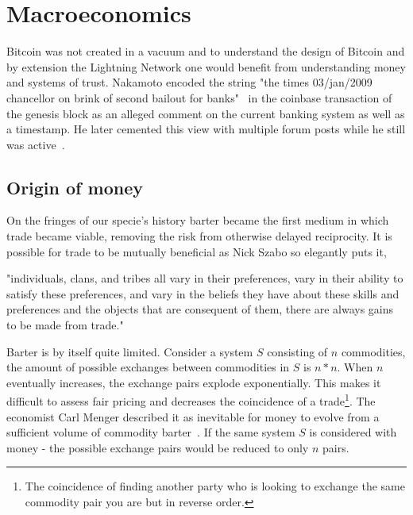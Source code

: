 \chapter{Macroeconomics}
\label{sec:macroeconomics}

Bitcoin was not created in a vacuum and to understand the design of Bitcoin and by extension the Lightning Network one would
benefit from understanding money and systems of trust. Nakamoto encoded the string "the times 03/jan/2009 chancellor on brink of second bailout for banks"~\cite{repository:bitcoin:sourceforge, bitcoin:genesis:coinbase} in the coinbase transaction of the genesis block as an alleged comment on the current banking system as well as a timestamp. He later cemented this view with multiple forum posts while he still was active~\cite{nakamoto:post:deflation, nakamoto:govern:print}.

\section{Origin of money}

On the fringes of our specie's history barter became the first medium in which trade became viable, removing the risk from otherwise delayed reciprocity. It is possible for trade to be mutually beneficial as Nick Szabo so elegantly puts it,

\begin{displayquote}

"individuals, clans, and tribes all vary in their preferences, vary in their ability to satisfy these preferences, and vary in the beliefs they have about these skills and preferences and the objects that are consequent of them, there are always gains to be made from trade."~\cite{szabo:shelling:out}

\end{displayquote}

Barter is by itself quite limited. Consider a system $S$
consisting of $n$ commodities, the amount of possible exchanges between commodities in $S$ is $n * n$. When $n$ eventually increases, the exchange pairs explode exponentially. This makes it difficult to assess fair pricing and decreases the coincidence of a trade\footnote{The coincidence of finding another party who is looking to exchange the same commodity pair you are but in reverse order.}. The economist Carl Menger described it as inevitable for money to evolve from a sufficient volume of commodity barter~\cite{menger:origins:money}. If the same system $S$ is considered with money - the possible exchange pairs would be reduced to only $n$ pairs. 

